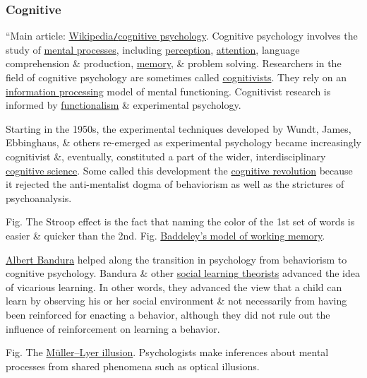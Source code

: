 \documentclass[oneside]{book}
\numberwithin{equation}{section}
\begin{document}
\subsubsection{Cognitive}
``Main article: \href{https://en.wikipedia.org/wiki/Cognitive_psychology}{Wikipedia\texttt{/}cognitive psychology}. Cognitive psychology involves the study of \href{https://en.wikipedia.org/wiki/Mental_process}{mental processes}, including \href{https://en.wikipedia.org/wiki/Perception}{perception}, \href{https://en.wikipedia.org/wiki/Attention}{attention}, language comprehension \& production, \href{https://en.wikipedia.org/wiki/Memory}{memory}, \& problem solving. Researchers in the field of cognitive psychology are sometimes called \href{https://en.wikipedia.org/wiki/Cognitivism_(psychology)}{cognitivists}. They rely on an \href{https://en.wikipedia.org/wiki/Information_processing}{information processing} model of mental functioning. Cognitivist research is informed by \href{https://en.wikipedia.org/wiki/Functionalism_(philosophy_of_mind)}{functionalism} \& experimental psychology.

Starting in the 1950s, the experimental techniques developed by Wundt, James, Ebbinghaus, \& others re-emerged as experimental psychology became increasingly cognitivist \&, eventually, constituted a part of the wider, interdisciplinary \href{https://en.wikipedia.org/wiki/Cognitive_science}{cognitive science}. Some called this development the \href{https://en.wikipedia.org/wiki/Cognitive_revolution}{cognitive revolution} because it rejected the anti-mentalist dogma of behaviorism as well as the strictures of psychoanalysis.

\textsf{Fig. The Stroop effect is the fact that naming the color of the 1st set of words is easier \& quicker than the 2nd. Fig. \href{https://en.wikipedia.org/wiki/Baddeley's_model_of_working_memory}{Baddeley's model of working memory}.}

\href{https://en.wikipedia.org/wiki/Albert_Bandura}{Albert Bandura} helped along the transition in psychology from behaviorism to cognitive psychology. Bandura \& other \href{https://en.wikipedia.org/wiki/Social_learning_theory}{social learning theorists} advanced the idea of vicarious learning. In other words, they advanced the view that a child can learn by observing his or her social environment \& not necessarily from having been reinforced for enacting a behavior, although they did not rule out the influence of reinforcement on learning a behavior.

\textsf{Fig. The \href{https://en.wikipedia.org/wiki/Muller-Lyer_illusion}{M\"uller--Lyer illusion}. Psychologists make inferences about mental processes from shared phenomena such as optical illusions.}
\end{document}
